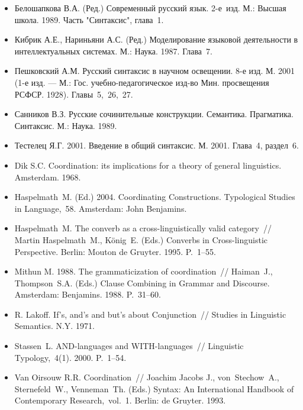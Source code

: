 \begin{itemize}
  \item
        Белошапкова В.А. (Ред.) Современный русский язык. 2-е~изд. М.: Высшая
        школа. 1989. Часть "Синтаксис", глава~1.
  \item
        Кибрик А.Е., Нариньяни А.С. (Ред.) Моделирование языковой деятельности
        в интеллектуальных системах. М.: Наука. 1987. Глава~7.
  \item
        Пешковский А.М. Русский синтаксис в научном освещении. 8-е изд. М.
        2001 (1-е изд. --- М.: Гос. учебно-педагогическое изд-во Мин.
        просвещения РСФСР. 1928). Главы~5,~26,~27.
  \item
        Санников В.З. Русские сочинительные конструкции. Семантика.
        Прагматика. Синтаксис. М.: Наука. 1989.
  \item
        Тестелец Я.Г. 2001. Введение в общий синтаксис. М. 2001. Глава~4,
        раздел~6.
  \item
        Dik S.C. Coordination: its implications for a theory of general
        linguistics. Amsterdam. 1968.
  \item
        Haspelmath~M. (Ed.) 2004. Coordinating Constructions. Typological
        Studies in Language,~58. Amsterdam: John Benjamins.
  \item
        Haspelmath~M. The converb as a cross-linguistically valid category~//
        Martin Haspelmath~M., König~E. (Eds.) Converbs in Cross-linguistic
        Perspective. Berlin: Mouton de Gruyter. 1995. P.~1--55.
  \item
        Mithun M. 1988. The grammaticization of coordination~// Haiman~J.,
        Thompson~S.A. (Eds.) Clause Combining in Grammar and Discourse.
        Amsterdam: Benjamins. 1988. P.~31--60.
  \item
        R. Lakoff. If's, and's and but's about Conjunction~// Studies in
        Linguistic Semantics. N.Y. 1971.
  \item
        Stassen~L. AND-languages and WITH-languages~// Linguistic
        Typology,~4(1). 2000. P.~1--54.
  \item
        Van Oirsouw R.R. Coordination~// Joachim Jacobs J., von~Stechow~A.,
        Sternefeld~W., Venneman~Th. (Eds.) Syntax: An International Handbook
        of Contemporary Research,~vol.~1. Berlin: de Gruyter. 1993.
\end{itemize}
